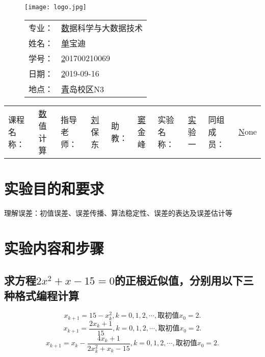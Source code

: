 \documentclass{zjureport}
\newcommand{\major}{数据科学与大数据技术}
\newcommand{\name}{单宝迪}
\newcommand{\stuid}{201700210069}
\newcommand{\newdate}{2019-09-16}
\newcommand{\loc}{青岛校区N3}
\newcommand{\course}{数值计算}
\newcommand{\tutor}{刘保东}
\newcommand{\TA}{窦金峰}
\newcommand{\newtitle}{实验一}
\newcommand{\group}{None}
\begin{document}
\thispagestyle{empty}
\begin{figure}[h]
  \begin{minipage}{0.6\linewidth}
    \centerline{\texttt{[image: logo.jpg]}}
  \end{minipage}
  \hfill
  \begin{minipage}{.4\linewidth}
    \raggedleft
    \begin{tabular*}{.8\linewidth}{ll}
      专业： & \underline\major   \\
      姓名： & \underline\name    \\
      学号： & \underline\stuid   \\
      日期： & \underline\newdate \\
      地点： & \underline\loc
    \end{tabular*}
  \end{minipage}
\end{figure}

\begin{table}[!htbp]
	\centering
	\begin{tabular*}{\linewidth}{llllllllll}
		课程名称： & \underline\course   & 指导老师： & \underline\tutor   & 助教：       &  \underline\TA & 实验名称： & \underline\newtitle & 同组成员： & \underline\group\\
	\end{tabular*}
\end{table}


\section{实验目的和要求}
  理解误差：初值误差、误差传播、算法稳定性、误差的表达及误差估计等
\section{实验内容和步骤}
\subsection{求方程$2x^2+x-15=0$的正根近似值，分别用以下三种格式编程计算}
  \[
  x_{k+1}=15-x^2_k,k=0,1,2,\cdots,\text{取初值}x_0=2.
  \]
  \[
  x_{k+1}=\frac{2x_k+1}{15},k=0,1,2,\cdots,\text{取初值}x_0=2.
  \]
  \[
  x_{k+1}=x_k-\frac{4x_k+1}{2x_k^2+x_k-15},k=0,1,2,\cdots,\text{取初值}x_0=2.
  \]
  
\end{document}

